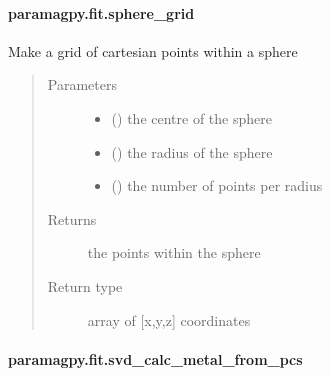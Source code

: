 \documentclass[a4paper,10pt,english]{sphinxmanual}
\begin{document}
\paragraph{paramagpy.fit.sphere\_grid}
\label{\detokenize{reference/generated/paramagpy.fit.sphere_grid:paramagpy-fit-sphere-grid}}\label{\detokenize{reference/generated/paramagpy.fit.sphere_grid::doc}}

\begin{fulllineitems}
\label{\detokenize{reference/generated/paramagpy.fit.sphere_grid:paramagpy.fit.sphere_grid}}
Make a grid of cartesian points within a sphere
\begin{quote}\begin{description}
\item[{Parameters}] \leavevmode\begin{itemize}
\item {} 
 () \textendash{} the centre of the sphere

\item {} 
 () \textendash{} the radius of the sphere

\item {} 
 () \textendash{} the number of points per radius

\end{itemize}

\item[{Returns}] \leavevmode
{} \textendash{} the points within the sphere

\item[{Return type}] \leavevmode
array of {[}x,y,z{]} coordinates

\end{description}\end{quote}

\end{fulllineitems}



\paragraph{paramagpy.fit.svd\_calc\_metal\_from\_pcs}
\label{\detokenize{reference/generated/paramagpy.fit.svd_calc_metal_from_pcs:paramagpy-fit-svd-calc-metal-from-pcs}}\label{\detokenize{reference/generated/paramagpy.fit.svd_calc_metal_from_pcs::doc}}
\end{document}
